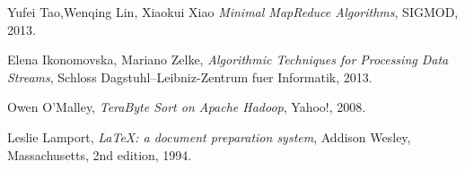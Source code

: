 \begin{thebibliography}{9}

  Yufei Tao,Wenqing Lin, Xiaokui Xiao
  \emph{Minimal MapReduce Algorithms},
  SIGMOD,
  2013.

  Elena Ikonomovska, Mariano Zelke,
  \emph{Algorithmic Techniques for Processing Data Streams},
  Schloss Dagstuhl--Leibniz-Zentrum fuer Informatik,
  2013.
  
  Owen O’Malley,
  \emph{TeraByte Sort on Apache Hadoop},
  Yahoo!,
  2008.
  
  
  Leslie Lamport,
  \emph{\LaTeX: a document preparation system},
  Addison Wesley, Massachusetts,
  2nd edition,
  1994.

\end{thebibliography}